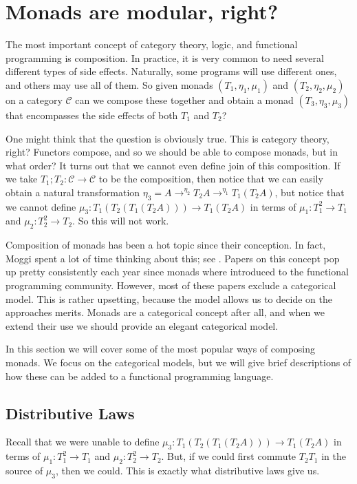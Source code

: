 \documentclass{article}
\let\mto\to
\let\to\relax
\newcommand{\to}{\rightarrow}
\newcommand{\cat}[1]{\mathcal{#1}}
\begin{document}
\section{Monads are modular, right?}
\label{sec:monads_are_modular,_right?}

The most important concept of category theory, logic, and functional
programming is composition.  In practice, it is very common to need
several different types of side effects.  Naturally, some programs
will use different ones, and others may use all of them.  So given
monads $(T_1,\eta_1,\mu_1)$ and $(T_2,\eta_2,\mu_2)$ on a category
$\cat{C}$ can we compose these together and obtain a monad
$(T_3,\eta_3,\mu_3)$ that encompasses the side effects of both $T_1$
and $T_2$?

One might think that the question is obviously true.  This is category
theory, right?  Functors compose, and so we should be able to compose
monads, but in what order?  It turns out that we cannot even define
join of this composition.  If we take $T_1;T_2 : \cat{C} \mto \cat{C}$
to be the composition, then notice that we can easily obtain a natural
transformation $\eta_3 = A \mto^{\eta_2} T_2 A \mto^{\eta_1} T_1(T_2
A)$, but notice that we cannot define $\mu_3 : T_1(T_2(T_1(T_2 A)))
\mto T_1(T_2 A)$ in terms of $\mu_1 : T^2_1 \mto T_1$ and $\mu_2 :
T^2_2 \mto T_2$.  So this will not work.  

Composition of monads has been a hot topic since their conception.  In
fact, Moggi spent a lot of time thinking about this; see
\cite{Moggi:1989a}. Papers on this concept pop up pretty consistently
each year since monads where introduced to the functional programming
community.  However, most of these papers exclude a categorical model.
This is rather upsetting, because the model allows us to decide on the
approaches merits.  Monads are a categorical concept after all, and
when we extend their use we should provide an elegant categorical
model.

In this section we will cover some of the most popular ways of
composing monads. We focus on the categorical models, but we will give
brief descriptions of how these can be added to a functional
programming language.

\subsection{Distributive Laws}
\label{subsec:distributive_laws}
Recall that we were unable to define $\mu_3 : T_1(T_2(T_1(T_2 A)))
\mto T_1(T_2 A)$ in terms of $\mu_1 : T^2_1 \mto T_1$ and $\mu_2 :
T^2_2 \mto T_2$.  But, if we could first commute $T_2T_1$ in the
source of $\mu_3$, then we could.  This is exactly what distributive
laws give us.
\end{document}
